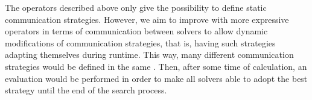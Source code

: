 The operators described above only give the possibility to define static communication strategies. However, we aim to improve \posl{} with more expressive operators in terms of communication between solvers to allow dynamic modifications of communication strategies, that is, having such strategies adapting themselves during runtime. This way, many different communication strategies would be defined in the same \soset. Then, after some time of calculation, an evaluation would be performed in order to make all solvers able to adopt the best strategy until the end of the search process.

